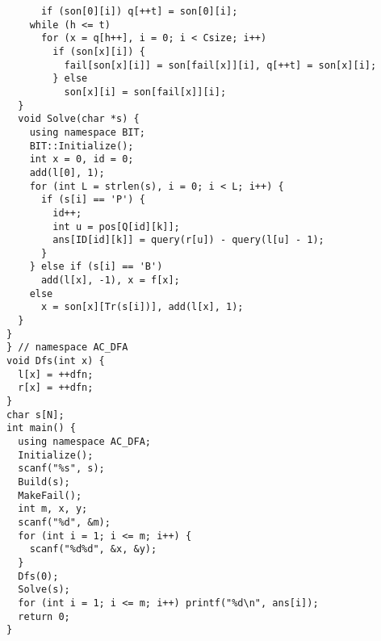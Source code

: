 \begin{lstlisting}
      if (son[0][i]) q[++t] = son[0][i];
    while (h <= t)
      for (x = q[h++], i = 0; i < Csize; i++)
        if (son[x][i]) {
          fail[son[x][i]] = son[fail[x]][i], q[++t] = son[x][i];
        } else
          son[x][i] = son[fail[x]][i];
  }
  void Solve(char *s) {
    using namespace BIT;
    BIT::Initialize();
    int x = 0, id = 0;
    add(l[0], 1);
    for (int L = strlen(s), i = 0; i < L; i++) {
      if (s[i] == 'P') {
        id++;
        int u = pos[Q[id][k]];
        ans[ID[id][k]] = query(r[u]) - query(l[u] - 1);
      }
    } else if (s[i] == 'B')
      add(l[x], -1), x = f[x];
    else
      x = son[x][Tr(s[i])], add(l[x], 1);
  }
}
} // namespace AC_DFA
void Dfs(int x) {
  l[x] = ++dfn;
  r[x] = ++dfn;
}
char s[N];
int main() {
  using namespace AC_DFA;
  Initialize();
  scanf("%s", s);
  Build(s);
  MakeFail();
  int m, x, y;
  scanf("%d", &m);
  for (int i = 1; i <= m; i++) {
    scanf("%d%d", &x, &y);
  }
  Dfs(0);
  Solve(s);
  for (int i = 1; i <= m; i++) printf("%d\n", ans[i]);
  return 0;
}
\end{lstlisting}

